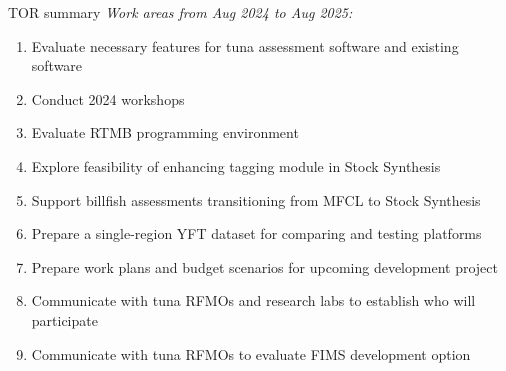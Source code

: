 \documentclass[aspectratio=169,fleqn]{beamer}
\begin{document}
\begin{frame}{TOR summary}
  \textit{\darkgray\small Work areas from Aug 2024 to Aug 2025:}\\[1ex]
  \begin{enumerate}
    \item Evaluate necessary {\darkgreen features} for tuna assessment software
    and existing {\darkgreen software}\\[1ex]
    \item Conduct 2024 {\darkgreen workshops}\\[1ex]
    \item Evaluate {\darkgreen RTMB} programming environment\\[1ex]
    \item Explore feasibility of enhancing {\darkgreen tagging module} in Stock
    Synthesis\\[1ex]
    \item Support {\darkgreen billfish assessments} transitioning from MFCL to
    Stock Synthesis\\[1ex]
    \item Prepare a {\darkgreen single-region YFT} dataset for comparing and
    testing platforms\\[1ex]
    \item Prepare work plans and budget scenarios for {\darkgreen upcoming
      development project}\\[1ex]
    \item Communicate with tuna RFMOs and research labs to establish {\darkgreen
      who will participate}\\[1ex]
    \item Communicate with tuna RFMOs to evaluate {\darkgreen FIMS development
      option}\\[3ex]
  \end{enumerate}
\end{frame}

\end{document}
